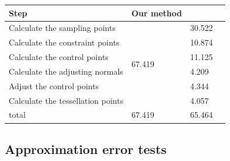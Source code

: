 \documentclass[3p]{elsarticle}
\makeatletter
\newcommand\tabcaption{\def\@captype{table}\caption}
\makeatother
\begin{document}
\begin{minipage}[c]{0.99\textwidth} 
  \centering
  \footnotesize
    \tabcaption{Comparison of the efficiencies of our method and \cite{Cui15}(deform stage)}
  \begin{tabular}{llll}
  	\hline
  	Step & Our method & \cite{Cui15}\\
  	\hline
      Calculate the sampling points     & \multirow{6}{*}{67.419} & 30.522     \\
  	Calculate the constraint points   &   & 10.874     \\
  	Calculate the control points      &   & 11.125     \\
  	Calculate the adjusting normals   &   & 4.209     \\
  	Adjust the control points         &   & 4.344     \\
  	Calculate the tessellation points &   & 4.057     \\
  	\hline
  	total                             & 67.419  & 65.464    \\
  	\hline
  \end{tabular}
  \label{tab:compare_deform}
\end{minipage}

\subsection{Approximation error tests}
\end{document}
